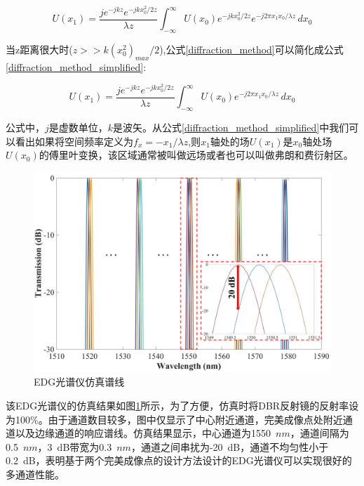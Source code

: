 \begin{equation}
\label{diffraction_method}
U(x_{1})=\dfrac{je^{-jkz}e^{-jkx_{0}^2/2 z}}{\lambda z}\int_{-\infty}^{\infty}U(x_{0})e^{-jkx_{0}^{2}/2z}e^{-j2\pi x_{1}x_{0}/\lambda z}\,dx_{0}
\end{equation}

当z距离很大时($z>>k(x_{0}^{2})_{max}/2$),公式\ref{diffraction_method}可以简化成公式\ref{diffraction_method_simplified}:

\begin{equation}
\label{diffraction_method_simplified}
U(x_{1})=\dfrac{je^{-jkz}e^{-jkx_{0}^2/2 z}}{\lambda z}\int_{-\infty}^{\infty}U(x_{0})e^{-j2\pi x_{1}x_{0}/\lambda z}\,dx_{0}
\end{equation}

公式中，$j$是虚数单位，$k$是波矢。从公式\ref{diffraction_method_simplified}中我们可以看出如果将空间频率定义为$f_{x}=-x_{1}/\lambda z$,则$x_{1}$轴处的场$U(x_{1})$是$x_{0}$轴处场$U(x_{0})$的傅里叶变换，该区域通常被叫做远场或者也可以叫做弗朗和费衍射区。

\begin{figure}[htb]
	\centering
	\includegraphics[width=14cm]{./Pictures/edg_simulated_spectrum.jpg}
	\captionsetup{justification=centering}
	\caption{EDG光谱仪仿真谱线}
	\label{edg_simulated_spectrum}
\end{figure}

该EDG光谱仪的仿真结果如图\ref{edg_simulated_spectrum}所示，为了方便，仿真时将DBR反射镜的反射率设为100\%。由于通道数目较多，图中仅显示了中心附近通道，完美成像点处附近通道以及边缘通道的响应谱线。仿真结果显示，中心通道为1550~$nm$，通道间隔为0.5~$nm$，3~dB带宽为0.3~$nm$，通道之间串扰为-20~dB，通道不均匀性小于0.2~dB，表明基于两个完美成像点的设计方法设计的EDG光谱仪可以实现很好的多通道性能。

